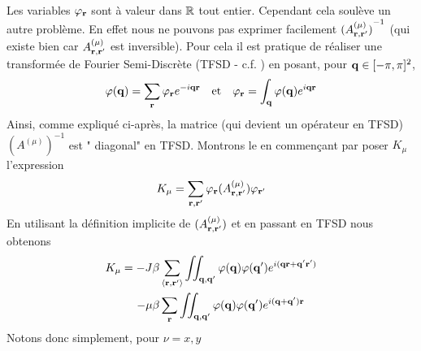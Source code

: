 \documentclass[10.5pt]{article}
\begin{document}
\begin{multicols}{2}
Les variables $\varphi_{\bf r}$ sont à valeur dans $\mathbb{R}$ tout entier. Cependant cela soulève un autre problème. En effet nous ne pouvons pas exprimer facilement ${(A_{{\bf r}, {\bf r}'}^{(\mu)})}^{-1}$ (qui existe bien car $A_{{\bf r}, {\bf r}'}^{(\mu)}$ est inversible). Pour cela il est pratique de réaliser une transformée de Fourier Semi-Discrète (TFSD - c.f. ) en posant, pour ${\bf q} \in [-\pi, \pi]^2$,
\begin{equation}
  {\varphi}({\bf q}) = \sum_{\bf r} \varphi_{\bf r} e^{-i{\bf q}{\bf r}} \quad \text{et} \quad \varphi_{\bf r} = \int_{\bf q} {\varphi}({\bf q})  e^{i{\bf q}{\bf r}}
\end{equation}
Ainsi, comme expliqué ci-après, la matrice (qui devient un opérateur en TFSD) ${(A^{(\mu)})}^{-1}$ est " diagonal" en TFSD. Montrons le en commençant par poser $K_\mu$ l'expression
\begin{equation}
	K_\mu = \sum\limits_{{\bf r}, {\bf r}'} \varphi_{\bf r} {(A_{{\bf r}, {\bf r}'}^{(\mu)})} \varphi_{{\bf r}'}
\end{equation} 
En utilisant la définition implicite de ${(A_{{\bf r}, {\bf r}'}^{(\mu)})}$ et en passant en TFSD nous obtenons
\begin{equation}
\begin{split}
  K_\mu = -J\beta & \sum_{\left<{\bf r}, {\bf r}'\right>} \iint_{{\bf q},{\bf q}'} {\varphi}({\bf q}) {\varphi}({\bf q}')  e^{i({\bf q}{\bf r}+{\bf q}'{\bf r}')} \\
   -\mu\beta & \sum_{\bf r} \iint_{{\bf q},{\bf q}'} {\varphi}({\bf q}) {\varphi}({\bf q}')  e^{i({\bf q}+{\bf q}'){\bf r}}
\end{split}
\end{equation}
Notons donc simplement, pour $\nu = x, y$

\end{multicols}
\end{document}
